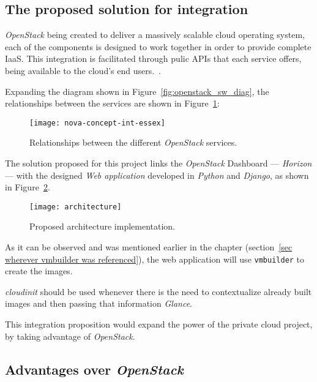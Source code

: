 \subsection{The proposed solution for integration}\label{subsec:proposition}

\textit{OpenStack} being created to deliver a massively scalable cloud operating system, each of the components is designed to work together in order to provide complete IaaS. This integration is facilitated through pulic APIs that each service offers, being available to the cloud's end users.~\cite{ken-pepple:essex-arch}. 

Expanding the diagram shown in Figure~\ref{fig:openstack_sw_diag}, the relationships between the services are shown in Figure~\ref{fig:openstack_services}:

\begin{figure}[h!]
  \begin{center}
    \leavevmode
    \texttt{[image: nova-concept-int-essex]}
    \caption{Relationships between the different \textit{OpenStack} services.~\cite{ken-pepple:essex-arch}}
    \label{fig:openstack_services}
  \end{center}
\end{figure}

The solution proposed for this project links the \textit{OpenStack} Dashboard --- \textit{Horizon} --- with the designed \textit{Web application} developed in \textit{Python} and \textit{Django}, as shown in Figure~\ref{fig:architecture}.

\begin{figure}[t]
  \begin{center}
    \leavevmode
    \texttt{[image: architecture]}
    \caption{Proposed architecture implementation.}
    \label{fig:architecture}
  \end{center}
\end{figure}

As it can be observed and was mentioned earlier in the chapter (section~\ref{sec wherever vmbuilder was referenced}), the web application will use \texttt{vmbuilder} to create the images. 

\textit{cloudinit} should be used whenever there is the need to contextualize already built images and then passing that information \textit{Glance}.

This integration proposition would expand the power of the private cloud project, by taking advantage of \textit{OpenStack}.

\subsection{Advantages over \textit{OpenStack}}

